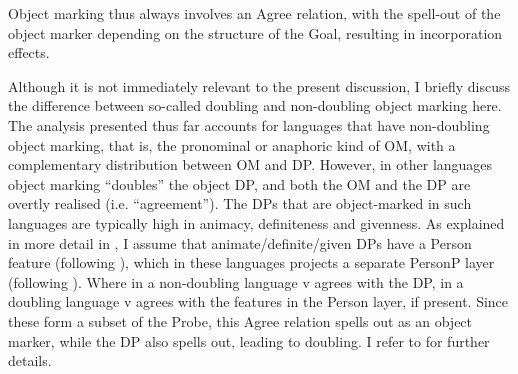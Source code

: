 \documentclass[output=paper
,modfonts
,nonflat]{langsci/langscibook}
\begin{document}
\begin{exe} 
	\ex \label{ex-vdwal:13}	 
	\xlist
	\endxlist
\end{exe}
Object marking thus always involves an Agree relation, with the spell-out of the object marker depending on the structure of the Goal, resulting in incorporation effects.

Although it is not immediately relevant to the present discussion, I briefly discuss the difference between so-called doubling and non-doubling object marking here. The analysis presented thus far accounts for languages that have non-doubling object marking, that is, the pronominal or anaphoric kind of OM, with a complementary distribution between OM and DP. However, in other languages object marking ``doubles'' the object DP, and both the OM and the DP are overtly realised (i.e. ``agreement''). The DPs that are object-marked in such languages are typically high in animacy, definiteness and givenness. As explained in more detail in \citet{Van_der_Wal2015}, I assume that animate/definite/given DPs have a Person feature (following \citealt{Richards2008, Richards2015}), which in these languages projects a separate PersonP layer (following \citealt{Hoehn2017}).  
Where in a non-doubling language v agrees with the DP, in a doubling language v agrees with the features in the Person layer, if present. Since these form a subset of the Probe, this Agree relation spells out as an object marker, while the DP also spells out, leading to doubling. I refer to \citet{Van_der_Wal2015} for further details.\largerpage
\end{document}
